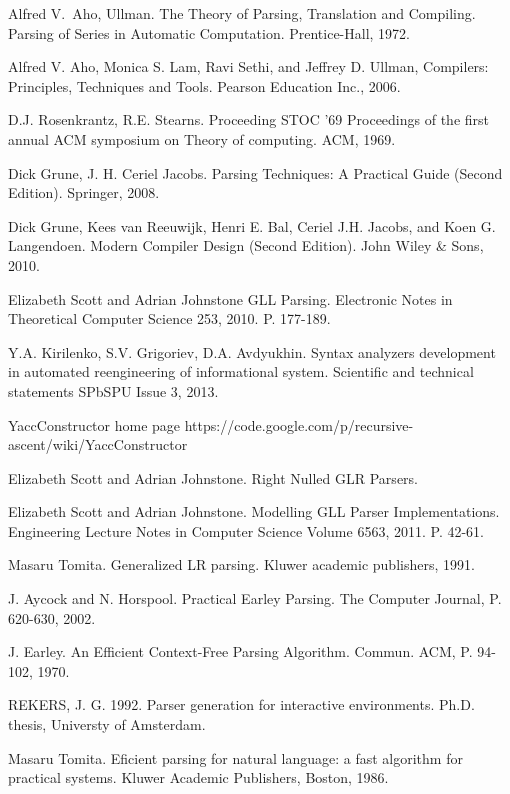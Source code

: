 \begin{thebibliography}{99}

Alfred V.~Aho, Ullman. The Theory of Parsing, Translation and Compiling. Parsing of Series in Automatic Computation. Prentice-Hall, 1972.

Alfred V. Aho, Monica S. Lam, Ravi Sethi, and Jeffrey D. Ullman, Compilers: Principles, Techniques and Tools. Pearson Education Inc., 2006.

D.J. Rosenkrantz, R.E. Stearns. Proceeding STOC '69 Proceedings of the first annual ACM symposium on Theory of computing. ACM, 1969.

Dick Grune, J. H. Ceriel Jacobs. Parsing Techniques: A Practical Guide (Second Edition). Springer, 2008.

Dick Grune, Kees van Reeuwijk, Henri E. Bal, Ceriel J.H. Jacobs, and Koen G. Langendoen. Modern Compiler Design (Second Edition). John Wiley \& Sons, 2010.

Elizabeth Scott and Adrian Johnstone GLL Parsing. Electronic Notes in Theoretical Computer Science 253, 2010. P. 177-189.

Y.A. Kirilenko, S.V. Grigoriev, D.A. Avdyukhin. Syntax analyzers development in automated reengineering of informational system. Scientific and technical statements SPbSPU Issue 3, 2013.

\relax YaccConstructor home page https://code.google.com/p/recursive-ascent/wiki/YaccConstructor

Elizabeth Scott and Adrian Johnstone. Right Nulled GLR Parsers.

Elizabeth Scott and Adrian Johnstone. Modelling GLL Parser Implementations. Engineering Lecture Notes in Computer Science Volume 6563, 2011. P. 42-61.

Masaru Tomita. Generalized LR parsing. Kluwer academic publishers, 1991.

J. Aycock and N. Horspool. Practical Earley Parsing. The Computer Journal, P. 620-630, 2002.

J. Earley. An Efficient Context-Free Parsing Algorithm. Commun. ACM, P. 94-102, 1970.

REKERS, J. G. 1992. Parser generation for interactive environments. Ph.D. thesis, Universty of Amsterdam.

Masaru Tomita. Eficient parsing for natural language: a fast algorithm for practical systems. Kluwer Academic Publishers, Boston, 1986.


\end{thebibliography}
